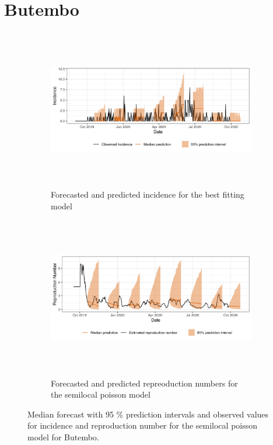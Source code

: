  \section{ Butembo }\begin{figure}[H]\begin{subfigure}{\textwidth}  \centering  \includegraphics[width=0.9\linewidth, height=7cm]{../output/Butembo_predictions.png}  \caption{Forecasted and predicted incidence for the best fitting model}\end{subfigure}

\begin{subfigure}{\textwidth}  \centering  \includegraphics[width=0.9\linewidth, height=7cm]{../output/Butembo_Rs.png}  \caption{Forecasted and predicted repreoduction numbers for the semilocal poisson model}\end{subfigure}  \caption{Median forecast with 95 \% prediction intervals and observed values for incidence and reproduction number for the semilocal poisson model for Butembo.}\end{figure}

